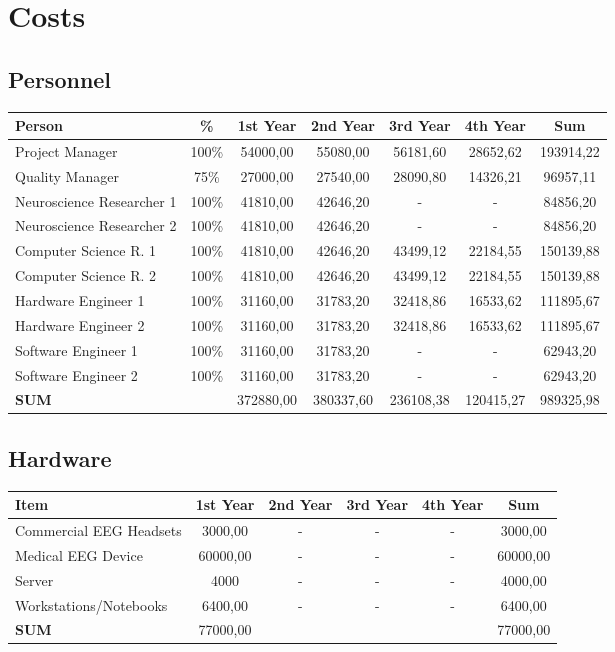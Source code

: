 \section{Costs}
\label{sect:costs}
\subsection{Personnel}
\begin{tabular}{|l|c|c|c|c|c|c|}
\hline 
Person & \% & 1st Year & 2nd Year & 3rd Year & 4th Year & Sum \\ 
\hline 
Project Manager & 100\% & 54000,00 & 55080,00 & 56181,60 & 28652,62 & 193914,22 \\ 
\hline 
Quality Manager & 75\% & 27000,00 & 27540,00 & 28090,80 & 14326,21 & 96957,11 \\ 
\hline 
Neuroscience Researcher 1 & 100\% & 41810,00 & 42646,20 & - & - & 84856,20 \\ 
\hline 
Neuroscience Researcher 2 & 100\% & 41810,00 & 42646,20 & - & - & 84856,20 \\ 
\hline 
Computer Science R. 1 & 100\% & 41810,00 & 42646,20 & 43499,12 & 22184,55 & 150139,88 \\ 
\hline 
Computer Science R. 2 & 100\% & 41810,00 & 42646,20 & 43499,12 & 22184,55 & 150139,88 \\ 
\hline 
Hardware Engineer 1 & 100\% & 31160,00 & 31783,20 & 32418,86 & 16533,62 & 111895,67 \\ 
\hline 
Hardware Engineer 2 & 100\% & 31160,00 & 31783,20 & 32418,86 & 16533,62 & 111895,67 \\ 
\hline 
Software Engineer 1 & 100\% & 31160,00 & 31783,20 & - & - & 62943,20 \\ 
\hline 
Software Engineer 2 & 100\% & 31160,00 & 31783,20 & - & - & 62943,20 \\ 
\hline 
\textbf{SUM} & & 372880,00 & 380337,60 & 236108,38 & 120415,27 & 989325,98 \\ 
\hline 
\end{tabular} 

\subsection{Hardware}
\begin{tabular}{|l|c|c|c|c|c|}
\hline 
Item & 1st Year & 2nd Year & 3rd Year & 4th Year & Sum \\ 
\hline 
Commercial EEG Headsets & 3000,00 & - & - & - & 3000,00 \\ 
\hline 
Medical EEG Device & 60000,00 & - & - & - & 60000,00 \\ 
\hline 
Server & 4000 & - & - & - & 4000,00 \\ 
\hline 
Workstations/Notebooks & 6400,00 & - & - & - & 6400,00 \\ 
\hline 
\textbf{SUM} & 77000,00 &  &  &  & 77000,00 \\ 
\hline 
\end{tabular}

